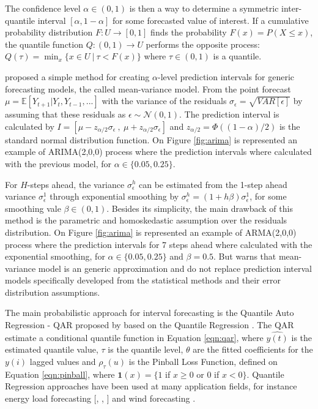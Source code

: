 The confidence level $\alpha \in (0,1)$ is then a way to determine a symmetric inter-quantile interval $[\alpha, 1-\alpha]$ for some forecasted value of interest. If a cumulative probability distribution $F:U \rightarrow [0,1]$ finds the probability $F(x) =  P(X \leq x)$, the quantile function $Q:(0,1) \rightarrow U$ performs the opposite process: $Q(\tau) = \min_x\{ x \in U \ |\ \tau < F(x) \}$ where $\tau \in (0,1)$ is a quantile.


\cite{Chatfield2001} proposed a simple method for creating $\alpha$-level prediction intervals for generic forecasting models, the called mean-variance model. From the point forecast $\mu = \mathbb{E}[Y_{t+1}|Y_t,Y_{t-1},...]$ with the variance of the residuals $\sigma_\epsilon = \sqrt{VAR[\epsilon]}$ by assuming that these residuals as $\epsilon \sim \mathcal{N}(0,1)$. The prediction interval is calculated by $I = [\mu - z_{\alpha/2}\sigma_\epsilon\ ,\ \mu + z_{\alpha/2}\sigma_\epsilon]$ and $z_{\alpha/2} = \Phi((1- \alpha)/2)$ is the standard normal distribution function. On Figure \ref{fig:arima} is represented an example of ARIMA(2,0,0) process where the prediction intervals where calculated with the previous model, for $\alpha \in \{0.05,0.25\}$. 

For $H$-steps ahead, the variance $\sigma_\epsilon^h$ can be estimated from the 1-step ahead variance $\sigma_\epsilon^1$ through exponential smoothing by $\sigma_\epsilon^h = (1 + h\beta)\sigma_\epsilon^1$, for some smoothing vale $\beta \in (0,1)$. Besides its simplicity, the main drawback of this method is the parametric and homoskedastic assumption over the residuals distribution. On Figure \ref{fig:arima} is represented an example of ARMA(2,0,0) process where the prediction intervals for 7 steps ahead where calculated with the exponential smoothing, for $\alpha \in \{0.05,0.25\}$ and $\beta = 0.5$. But \cite{Chatfield2001} warns that mean-variance model is an generic approximation and do not replace prediction interval models specifically developed from the statistical methods and their error distribution assumptions. 


The main probabilistic approach for interval forecasting is the Quantile Auto Regression - QAR proposed by \cite{Koenker2006} based on the Quantile Regression \cite{Koenker2001}. The QAR estimate a conditional quantile function in Equation \ref{eqn:qar}, where $\hat{y(t)}$ is the estimated quantile value, $\tau$ is the quantile level, $\theta$ are the fitted coefficients for the $y(i)$ lagged values and $\rho_\tau(u)$ is the Pinball Loss Function, defined on Equation \ref{eqn:pinball}, where $\mathbf{1}(x) = \{ 1$ if $x \geq 0$ or $0$ if $x < 0\}$. Quantile Regression approaches have been used at many application fields, for instance energy load forecasting [\cite{Liu2015}, \cite{Hong2016}, \cite{Hong2016a}] and wind forecasting \cite{Pinson2006}.

